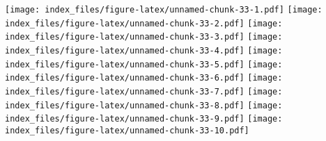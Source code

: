 \documentclass[
]{book}
\newenvironment{Shaded}{\begin{snugshade}}{\end{snugshade}}
\newcommand{\AttributeTok}[1]{\textcolor[rgb]{0.77,0.63,0.00}{#1}}
\newcommand{\ConstantTok}[1]{\textcolor[rgb]{0.00,0.00,0.00}{#1}}
\newcommand{\ControlFlowTok}[1]{\textcolor[rgb]{0.13,0.29,0.53}{\textbf{#1}}}
\newcommand{\DecValTok}[1]{\textcolor[rgb]{0.00,0.00,0.81}{#1}}
\newcommand{\FunctionTok}[1]{\textcolor[rgb]{0.00,0.00,0.00}{#1}}
\newcommand{\NormalTok}[1]{#1}
\newcommand{\OtherTok}[1]{\textcolor[rgb]{0.56,0.35,0.01}{#1}}
\newcommand{\SpecialCharTok}[1]{\textcolor[rgb]{0.00,0.00,0.00}{#1}}
\newcommand{\StringTok}[1]{\textcolor[rgb]{0.31,0.60,0.02}{#1}}
\begin{document}
\begin{Shaded}
\end{Shaded}

\texttt{[image: index\_files/figure-latex/unnamed-chunk-33-1.pdf]} \texttt{[image: index\_files/figure-latex/unnamed-chunk-33-2.pdf]} \texttt{[image: index\_files/figure-latex/unnamed-chunk-33-3.pdf]} \texttt{[image: index\_files/figure-latex/unnamed-chunk-33-4.pdf]} \texttt{[image: index\_files/figure-latex/unnamed-chunk-33-5.pdf]} \texttt{[image: index\_files/figure-latex/unnamed-chunk-33-6.pdf]} \texttt{[image: index\_files/figure-latex/unnamed-chunk-33-7.pdf]} \texttt{[image: index\_files/figure-latex/unnamed-chunk-33-8.pdf]} \texttt{[image: index\_files/figure-latex/unnamed-chunk-33-9.pdf]} \texttt{[image: index\_files/figure-latex/unnamed-chunk-33-10.pdf]}
\end{document}
